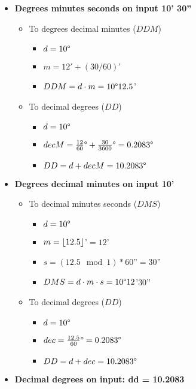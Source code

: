 \begin{itemize}
	\item \textbf{Degrees minutes seconds on input 10' 30''}
	\begin{itemize}
		\item To degrees decimal minutes ($DDM$)
		\begin{itemize}
			\setlength\itemsep{0.00005em}
			\item $ d = 10\degree $
			\item $ m = 12' + (30/60)$'
			\item $DDM = d \cdot m = 10\degree 12.5$'
		\end{itemize}
		\item To decimal degrees ($DD$)
		\begin{itemize}
			\setlength\itemsep{0.00005em}
			\item $ d = 10\degree $
			\item $ decM = \frac{12}{60}\degree + \frac{30}{3600}\degree = 0.2083\degree$
			\item $ DD = d + decM = 10.2083\degree $
		\end{itemize}
	\end{itemize}
	\item \textbf{Degrees decimal minutes on input 10'}
	\begin{itemize}
		\item To decimal minutes seconds ($DMS$)
		\begin{itemize}
			\setlength\itemsep{0.00005em}
			\item $ d = 10\degree $
			\item $ m = \lfloor12.5\rfloor$'$ = 12$'
			\item $ s = (12.5 \mod 1) * 60$''$ = 30$''
			\item $ DMS = d \cdot m \cdot s = 10\degree 12$'$ 30$''
		\end{itemize}
		\item To decimal degrees ($DD$)
		\begin{itemize}
			\setlength\itemsep{0.00005em}
			\item $ d = 10\degree $
			\item $ dec = \frac{12.5}{60}\degree = 0.2083\degree$
			\item $ DD = d + dec = 10.2083\degree$
		\end{itemize}
	\end{itemize}
	\item \textbf{Decimal degrees on input: dd = 10.2083\degree}
	\begin{itemize}

\end{itemize}
\end{itemize}
